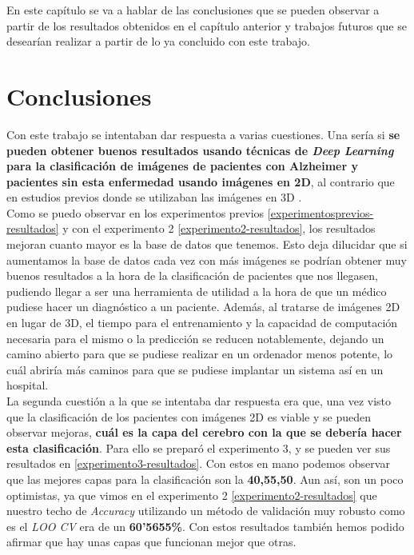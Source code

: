 
En este capítulo se va a hablar de las conclusiones que se pueden observar a partir de los resultados obtenidos en el capítulo anterior y trabajos futuros que se desearían realizar a partir de lo ya concluido con este trabajo.\\

\section{Conclusiones}

Con este trabajo se intentaban dar respuesta a varias cuestiones. Una sería si \textbf{se pueden obtener buenos resultados usando técnicas de \textit{Deep Learning} para la clasificación de imágenes de pacientes con Alzheimer y pacientes sin esta enfermedad usando imágenes en 2D}, al contrario que en estudios previos donde se utilizaban las imágenes en 3D \cite{residualVGG}.\\

Como se puedo observar en los experimentos previos \ref{experimentosprevios-resultados} y con el experimento 2 \ref{experimento2-resultados}, los resultados mejoran cuanto mayor es la base de datos que tenemos. Esto deja dilucidar que si aumentamos la base de datos cada vez con más imágenes se podrían obtener muy buenos resultados a la hora de la clasificación de pacientes que nos llegasen, pudiendo llegar a ser una herramienta de utilidad a la hora de que un médico pudiese hacer un diagnóstico a un paciente. Además, al tratarse de imágenes 2D en lugar de 3D, el tiempo para el entrenamiento y la capacidad de computación necesaria para el mismo o la predicción se reducen notablemente, dejando un camino abierto para que se pudiese realizar en un ordenador menos potente, lo cuál abriría más caminos para que se pudiese implantar un sistema así en un hospital.\\

La segunda cuestión a la que se intentaba dar respuesta era que, una vez visto que la clasificación de los pacientes con imágenes 2D es viable y se pueden observar mejoras, \textbf{cuál es la capa del cerebro con la que se debería hacer esta clasificación}. Para ello se preparó el experimento 3, y se pueden ver sus resultados en \ref{experimento3-resultados}. Con estos en mano podemos observar que las mejores capas para la clasificación son la \textbf{40,55,50}. Aun así, son un poco optimistas, ya que vimos en el experimento 2 \ref{experimento2-resultados} que nuestro techo de \textit{Accuracy} utilizando un método de validación muy robusto como es el \textit{LOO CV} era de un \textbf{60'5655\%}. Con estos resultados también hemos podido afirmar que hay unas capas que funcionan mejor que otras.\\

